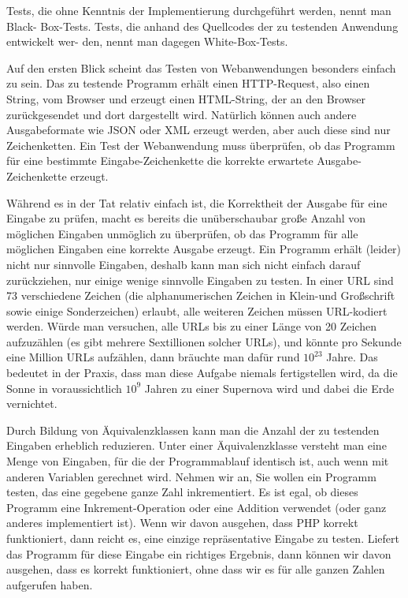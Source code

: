 Tests, die ohne Kenntnis der Implementierung durchgeführt werden, nennt man Black-
Box-Tests. Tests, die anhand des Quellcodes der zu testenden Anwendung entwickelt wer-
den, nennt man dagegen White-Box-Tests.

Auf den ersten Blick scheint das Testen von Webanwendungen besonders einfach zu sein.
Das zu testende Programm erhält einen HTTP-Request, also einen String, vom Browser
und erzeugt einen HTML-String, der an den Browser zurückgesendet und dort dargestellt
wird. Natürlich können auch andere Ausgabeformate wie JSON oder XML erzeugt werden,
aber auch diese sind nur Zeichenketten. Ein Test der Webanwendung muss überprüfen, ob
das Programm für eine bestimmte Eingabe-Zeichenkette die korrekte erwartete Ausgabe-
Zeichenkette erzeugt.

Während es in der Tat relativ einfach ist, die Korrektheit der Ausgabe für eine Eingabe zu
prüfen, macht es bereits die unüberschaubar große Anzahl von möglichen Eingaben unmöglich 
zu überprüfen, ob das Programm für alle möglichen Eingaben eine korrekte Ausgabe erzeugt. 
Ein Programm erhält (leider) nicht nur sinnvolle Eingaben, deshalb kann man sich nicht
einfach darauf zurückziehen, nur einige wenige sinnvolle Eingaben zu testen. In einer 
URL sind 73 verschiedene Zeichen (die alphanumerischen Zeichen in Klein-und Großschrift 
sowie einige Sonderzeichen) erlaubt, alle weiteren Zeichen müssen URL-kodiert werden. 
Würde man versuchen, alle URLs bis zu einer Länge von 20 Zeichen aufzuzählen 
(es gibt mehrere Sextillionen solcher URLs), und könnte 
pro Sekunde eine Million URLs aufzählen, dann bräuchte man dafür rund $10^{23}$ Jahre. Das bedeutet 
in der Praxis, dass man diese Aufgabe niemals fertigstellen wird, da die Sonne in voraussichtlich $10^{9}$
Jahren zu einer Supernova wird und dabei die Erde vernichtet.

Durch Bildung von Äquivalenzklassen kann man die Anzahl der zu testenden Eingaben
erheblich reduzieren. Unter einer Äquivalenzklasse versteht man eine Menge von Eingaben,
für die der Programmablauf identisch ist, auch wenn mit anderen Variablen gerechnet wird. 
Nehmen wir an, Sie wollen ein Programm testen, das eine gegebene ganze Zahl inkrementiert. 
Es ist egal, ob dieses Programm eine Inkrement-Operation oder eine Addition verwendet 
(oder ganz anderes implementiert ist). Wenn wir davon ausgehen, dass PHP korrekt funktioniert, 
dann reicht es, eine einzige repräsentative Eingabe zu testen. Liefert das Programm für 
diese Eingabe ein richtiges Ergebnis, dann können wir davon ausgehen, dass es korrekt funktioniert, 
ohne dass wir es für alle ganzen Zahlen aufgerufen haben.

